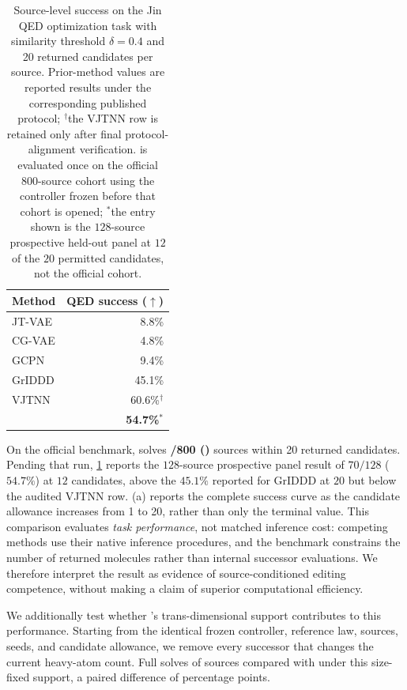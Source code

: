 \begin{table}[t]
\centering
{\small
\begin{tabular}{lr}
\toprule
Method & QED success ($\uparrow$) \\
\midrule
JT-VAE & 8.8\% \\
CG-VAE & 4.8\% \\
GCPN & 9.4\% \\
GrIDDD & 45.1\% \\
VJTNN & 60.6\%$^{\dagger}$ \\
\textbf{\method{}} & \textbf{54.7\%}$^{*}$ \\
\bottomrule
\end{tabular}}
\caption{\small Source-level success on the Jin QED optimization task with similarity threshold $\delta=0.4$ and 20 returned candidates per source. Prior-method values are reported results under the corresponding published protocol; $^{\dagger}$the VJTNN row is retained only after final protocol-alignment verification. \method{} is evaluated once on the official 800-source cohort using the controller frozen before that cohort is opened; $^{*}$the entry shown is the $128$-source prospective held-out panel at $12$ of the $20$ permitted candidates, not the official cohort.}
\label{tab:jin}
\end{table}

On the official benchmark, \method{} solves \textbf{\XXX{}/800 (\XXX{})} sources within 20 returned candidates. Pending that run, \cref{tab:jin} reports the $128$-source prospective panel result of $70/128$ ($54.7\%$) at $12$ candidates, above the $45.1\%$ reported for GrIDDD at $20$ but below the audited VJTNN row. (a) reports the complete success curve as the candidate allowance increases from 1 to 20, rather than only the terminal value. This comparison evaluates \emph{task performance}, not matched inference cost: competing methods use their native inference procedures, and the benchmark constrains the number of returned molecules rather than internal successor evaluations. We therefore interpret the result as evidence of source-conditioned editing competence, without making a claim of superior computational efficiency.

We additionally test whether \method{}'s trans-dimensional support contributes to this performance. Starting from the identical frozen controller, reference law, sources, seeds, and candidate allowance, we remove every successor that changes the current heavy-atom count. Full \method{} solves \textbf{\XXX{}} of sources compared with \textbf{\XXX{}} under this size-fixed support, a paired difference of \textbf{\XXX{}} percentage points. 

